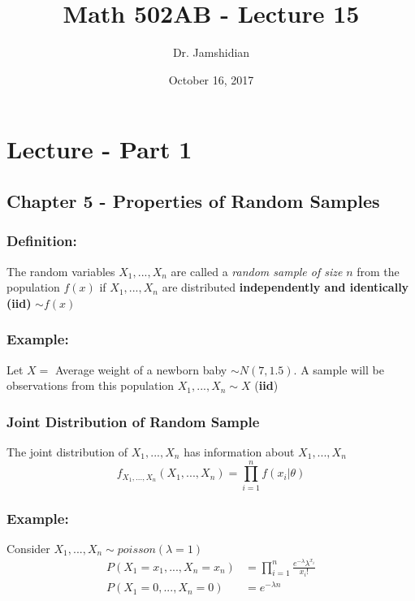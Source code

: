 \documentclass{article}
\title{Math 502AB - Lecture 15}
\author{Dr. Jamshidian}
\date{October 16, 2017}
\begin{document}
\maketitle

\section{Lecture - Part 1}

\subsection{Chapter 5 - Properties of Random Samples}

\subsubsection*{Definition:}

The random variables $X_1,...,X_n$ are called a \textit{random sample of size} $n$ from the population $f(x)$ if $X_1,...,X_n$ are distributed \textbf{independently and identically (iid)} $\sim f(x)$

\subsubsection*{Example:}
Let $X = $ Average weight of a newborn baby $\sim N(7,1.5)$. A sample will be observations from this population $X_1,...,X_n \sim X$ (\textbf{iid})

\subsubsection{Joint Distribution of Random Sample}

\noindent The joint distribution of $X_1,...,X_n$ has information about $X_1,...,X_n$
\begin{equation*}
    f_{X_1,...,X_n}(X_1,...,X_n) = \prod_{i=1}^n f(x_i | \theta)
\end{equation*}

\subsubsection*{Example:}

Consider $X_1,...,X_n \sim poisson(\lambda = 1)$
\begin{equation*}
\begin{split}
    P(X_1=x_1,...,X_n = x_n) &= \prod_{i=1}^n \frac{e^{-\lambda}\lambda^{x_i}}{x_i!}\\
    P(X_1 = 0,...,X_n = 0) &= e^{-\lambda n}
\end{split}
\end{equation*}
\end{document}
